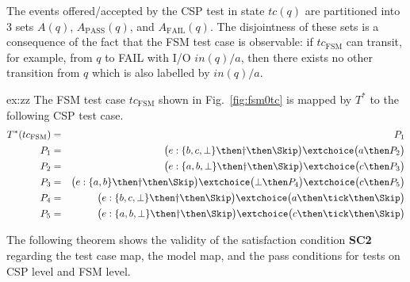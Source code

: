 The events offered/accepted by the CSP test in state $tc(q)$ are partitioned into
3 sets $A(q)$, $A_\text{PASS}(q)$, and $A_\text{FAIL}(q)$. The disjointness of these
sets is a consequence of the fact that the FSM test case is observable: if
$tc_\text{FSM}$ can transit, for example, from $q$ to FAIL with I/O $in(q)/a$,
then there exists no other transition from $q$ which is also
labelled by $in(q)/a$.



\begin{example}{ex:zz}
The FSM test case $tc_\text{FSM}$
shown in Fig.~\ref{fig:fsm0tc} is mapped by $T^*$ to the following
CSP test case.
\begin{eqnarray*}
T^*(tc_\text{FSM}) & = & P_1
\\
P_1 & = & \big(e:\{ b,c,\bot \}   \then \dag\then\Skip\big)
\extchoice
 \big( a \then P_2 \big)
\\
P_2 & = & \big( e : \{ a,b,\bot \} \then \dag\then\Skip  \big)
\extchoice
\big( c\then P_3 \big)
\\
P_3 & = & \big( e : \{ a,b \} \then \dag\then\Skip  \big)
\extchoice
\big( \bot \then P_4 \big)
\extchoice
\big( c\then P_5 \big)
\\
P_4 & = & \big( e : \{ b,c,\bot \} \then \dag\then\Skip  \big)
\extchoice
\big( a\then\tick\then \Skip \big)
\\
P_5 & = & \big( e : \{ a,b,\bot \} \then \dag\then\Skip  \big)
\extchoice
\big( c\then\tick\then \Skip \big)
\end{eqnarray*}
\end{example}

The following theorem shows the validity of the satisfaction condition {\bf SC2}
regarding the test case map, the model map, and the pass conditions for tests on CSP level and FSM level.

